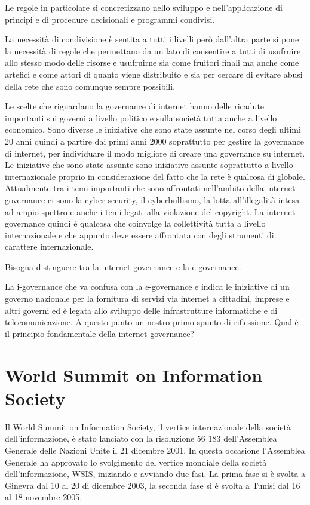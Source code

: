 Le regole in particolare si concretizzano nello sviluppo e nell'applicazione di principi e di procedure decisionali e programmi condivisi.\par
La necessità di condivisione è sentita a tutti i livelli però  dall'altra parte si pone la necessità di regole che permettano da un lato di consentire a tutti di usufruire allo stesso modo delle risorse e usufruirne sia come fruitori finali ma anche come artefici e come attori di quanto viene distribuito e sia per cercare di evitare abusi della rete che sono comunque sempre possibili.\par
Le scelte che riguardano la governance di internet hanno delle ricadute importanti sui governi a livello politico e sulla società tutta anche a livello economico. Sono diverse le iniziative che sono state assunte nel corso degli ultimi 20 anni quindi a partire dai primi anni 2000 soprattutto per gestire la governance di internet, per individuare il modo migliore di creare una governance su internet. Le iniziative che sono state assunte sono iniziative assunte soprattutto a livello internazionale proprio in considerazione del fatto che la rete è qualcosa di globale. Attualmente tra i temi importanti che sono affrontati nell'ambito della internet governance ci sono la cyber security, il cyberbullismo, la lotta all'illegalità intesa ad ampio spettro e anche i temi legati alla violazione del copyright. La internet governance quindi è qualcosa che coinvolge la collettività tutta a livello internazionale e che appunto deve essere affrontata con degli strumenti di carattere internazionale.\par
Bisogna distinguere tra la internet governance e la e-governance.\par
La i-governance che  va  confusa con la e-governance e indica le iniziative di un governo nazionale per la fornitura di servizi via internet a cittadini, imprese e altri governi ed è legata allo sviluppo delle infrastrutture informatiche e di telecomunicazione.
A questo punto un nostro primo spunto di riflessione. Qual è il principio fondamentale della internet governance?

\section{World Summit on Information Society}
Il World Summit on Information Society, il vertice internazionale della società dell'informazione, è stato lanciato con la risoluzione 56 183 dell'Assemblea Generale delle Nazioni Unite il 21 dicembre 2001. In questa occasione l'Assemblea Generale ha approvato lo svolgimento del vertice mondiale della società dell'informazione, WSIS, iniziando e avviando due fasi. La prima fase si è svolta a Ginevra dal 10 al 20 di dicembre 2003, la seconda fase si è svolta a Tunisi dal 16 al 18 novembre 2005.


